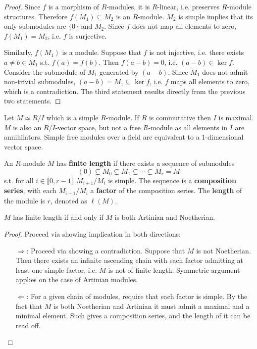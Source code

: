 \begin{proof}
    Since $f$ is a morphism of $R$-modules, it is $R$-linear, i.e. preserves $R$-module structures. Therefore $f(M_1) \subseteq M_2$ is an $R$-module. $M_2$ is simple implies that its only submodules are $\{0\}$ and $M_2$. Since $f$ does not map all elements to zero, $f(M_1) = M_2$, i.e. $f$ is surjective.

    Similarly, $f(M_1)$ is a module. Suppose that $f$ is not injective, i.e. there exists $a\neq b \in M_1$ s.t. $f(a) = f(b)$. Then $f(a - b) = 0$, i.e. $(a - b)\in\ker f$. Consider the submodule of $M_1$ generated by $(a - b)$. Since $M_1$ does not admit non-trivial submodules, $(a - b) = M_1 \subseteq \ker f$, i.e. $f$ maps all elements to zero, which is a contradiction. The third statement results directly from the previous two statements.
\end{proof}

\begin{remark}
    Let $M\simeq R/I$ which is a simple $R$-module. If $R$ is commutative then $I$ is maximal. $M$ is also an $R/I$-vector space, but not a free $R$-module as all elements in $I$ are annihilators. Simple free modules over a field are equivalent to a 1-dimensional vector space.
\end{remark}

\begin{definition}
    An $R$-module $M$ has \textbf{finite length} if there exists a sequence of submodules
    \[
        (0) \subsetneq M_0 \subsetneq M_1 \subsetneq \cdots \subsetneq M_r = M
    \]
    s.t. for all $i\in\llbracket 0, r - 1 \rrbracket$ $M_{i+1}/M_i$ is simple. The sequence is a \textbf{composition series}, with each $M_{i+1}/M_i$ a \textbf{factor} of the composition series. The \textbf{length} of the module is $r$, denoted as $\ell(M)$.
\end{definition}

\begin{proposition}\label{prop:Finite length implies Noeth and Artin}
    $M$ has finite length if and only if $M$ is both Artinian and Noetherian.
\end{proposition}

\begin{proof}
    Proceed via showing implication in both directions:
    \begin{itemize}
        \item[$\Rightarrow$:] Proceed via showing a contradiction. Suppose that $M$ is not Noetherian. Then there exists an infinite ascending chain with each factor admitting at least one simple factor, i.e. $M$ is not of finite length. Symmetric argument applies on the case of Artinian modules.
        \item[$\Leftarrow$:] For a given chain of modules, require that each factor is simple. By the fact that $M$ is both Noetherian and Artinian it must admit a maximal and a minimal element. Such gives a composition series, and the length of it can be read off. 
    \end{itemize}
\end{proof}

